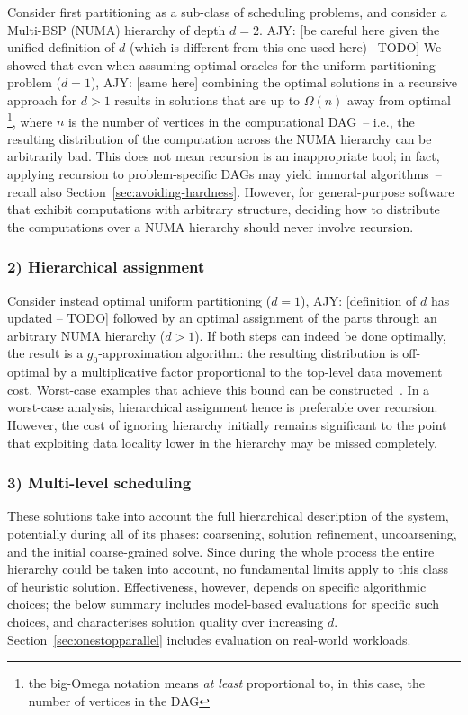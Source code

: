 \documentclass[oneside,reqno, a4paper]{amsart}
\numberwithin{equation}{section}
\newcommand{\ajy}[1]{{\color{orange} \sf AJY: [#1]}}
\begin{document}
Consider first partitioning as a sub-class of scheduling problems,
and consider a Multi-BSP (NUMA) hierarchy of depth $d=2$.
\ajy{be careful here given the unified definition of $d$ (which is different from this one used here)-- TODO}
We showed that even when assuming optimal oracles for the uniform partitioning problem ($d=1$),
\ajy{same here}
combining the optimal solutions in a recursive approach for $d>1$ results in solutions that are up to $\Omega(n)$ away from optimal%
\footnote{the big-Omega notation means \emph{at least} proportional to, in this case, the number of vertices in the DAG},
where $n$ is the number of vertices in the computational DAG~\cite[Lemma 7.2]{hypergraphs_opdas}--
i.e., the resulting distribution of the computation across the NUMA hierarchy can be arbitrarily bad. 
This does not mean recursion is an inappropriate tool;
in fact,
applying recursion to problem-specific DAGs may yield immortal algorithms~\cite{mccoll99}--
recall also Section~\ref{sec:avoiding-hardness}.
However,
for general-purpose software that exhibit computations with arbitrary structure,
deciding how to distribute the computations over a NUMA hierarchy should never involve recursion.

\subsubsection*{2) Hierarchical assignment}

Consider instead optimal uniform partitioning ($d=1$),
\ajy{definition of $d$ has updated -- TODO}
followed by an optimal assignment of the parts through an arbitrary NUMA hierarchy ($d>1$).
If both steps can indeed be done optimally,
the result is a $g_0$-approximation algorithm:
the resulting distribution is off-optimal by a multiplicative factor proportional to the top-level data movement cost.
Worst-case examples that achieve this bound can be constructed~\cite[Theorem 7.4]{hypergraphs_opdas}.
In a worst-case analysis,
hierarchical assignment hence is preferable over recursion.
However,
the cost of ignoring hierarchy initially remains significant to the point that exploiting data locality lower in the hierarchy may be missed completely.

\subsubsection*{3) Multi-level scheduling}

These solutions take into account the full hierarchical description of the system,
potentially during all of its phases:
coarsening, solution refinement, uncoarsening, and the initial coarse-grained solve.
Since during the whole process the entire hierarchy could be taken into account,
no fundamental limits apply to this class of heuristic solution.
Effectiveness, however,
depends on specific algorithmic choices;
the below summary includes model-based evaluations for specific such choices,
and characterises solution quality over increasing $d$.
Section~\ref{sec:onestopparallel} includes evaluation on real-world workloads.
\end{document}
